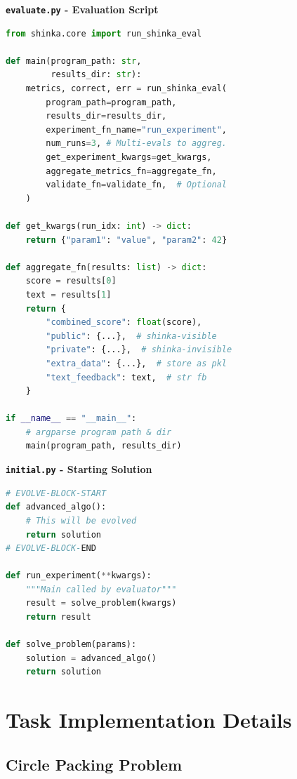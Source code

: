 \documentclass[11pt, a4paper]{include/gdm_format}
\begin{document}
\begin{minipage}{0.45\textwidth}
\textbf{\texttt{evaluate.py} - Evaluation Script}

\begin{lstlisting}[language=Python, basicstyle=\ttfamily\tiny]
from shinka.core import run_shinka_eval

def main(program_path: str,
         results_dir: str):
    metrics, correct, err = run_shinka_eval(
        program_path=program_path,
        results_dir=results_dir,
        experiment_fn_name="run_experiment",
        num_runs=3, # Multi-evals to aggreg.
        get_experiment_kwargs=get_kwargs,
        aggregate_metrics_fn=aggregate_fn,
        validate_fn=validate_fn,  # Optional
    )

def get_kwargs(run_idx: int) -> dict:
    return {"param1": "value", "param2": 42}

def aggregate_fn(results: list) -> dict:
    score = results[0]
    text = results[1]
    return {
        "combined_score": float(score),
        "public": {...},  # shinka-visible
        "private": {...},  # shinka-invisible
        "extra_data": {...},  # store as pkl
        "text_feedback": text,  # str fb
    }

if __name__ == "__main__":
    # argparse program path & dir
    main(program_path, results_dir)
\end{lstlisting}
\end{minipage}
\hfill
\begin{minipage}{0.45\textwidth}
\textbf{\texttt{initial.py} - Starting Solution}

\begin{lstlisting}[language=Python, basicstyle=\ttfamily\tiny]
# EVOLVE-BLOCK-START
def advanced_algo():
    # This will be evolved
    return solution
# EVOLVE-BLOCK-END

def run_experiment(**kwargs):
    """Main called by evaluator"""
    result = solve_problem(kwargs)
    return result

def solve_problem(params):
    solution = advanced_algo()
    return solution
\end{lstlisting}
\end{minipage}



\clearpage
\section{Task Implementation Details}
\label{appsec:implememtation}
\subsection{Circle Packing Problem}
\end{document}
